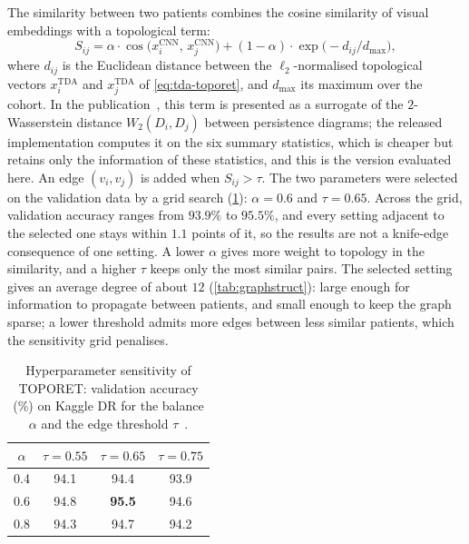 The similarity between two patients combines the cosine similarity of visual embeddings
with a topological term:
\begin{equation}
S_{ij} = \alpha\cdot\cos\bigl(x_i^{\mathrm{CNN}},\, x_j^{\mathrm{CNN}}\bigr)
       + (1-\alpha)\cdot\exp\bigl(-d_{ij}/d_{\max}\bigr),
\label{eq:dualsim}
\end{equation}
where $d_{ij}$ is the Euclidean distance between the $\ell_2$-normalised topological vectors
$x_i^{\mathrm{TDA}}$ and $x_j^{\mathrm{TDA}}$ of \cref{eq:tda-toporet}, and $d_{\max}$ its maximum over
the cohort. In the publication~\cite{belhadj2025plos}, this term is presented as a
surrogate of the $2$-Wasserstein distance $W_2(D_i,D_j)$ between persistence diagrams; the
released implementation computes it on the six summary statistics, which is cheaper but
retains only the information of these statistics, and this is the version evaluated here.
An edge
$(v_i,v_j)$ is added when $S_{ij}>\tau$. The two parameters were selected on the validation
data by a grid search (\cref{tab:hparam}): $\alpha=0.6$ and $\tau=0.65$. Across the grid,
validation accuracy ranges from $93.9\%$ to $95.5\%$, and every setting adjacent to the
selected one stays within $1.1$ points of it, so the results are not a knife-edge
consequence of one setting. A lower $\alpha$ gives more weight to topology in the
similarity, and a higher $\tau$ keeps only the most similar pairs. The selected setting
gives an average degree of about $12$ (\cref{tab:graphstruct}): large enough for information
to propagate between patients, and small enough to keep the graph sparse; a lower
threshold admits more edges between less similar patients, which the sensitivity grid
penalises.

\begin{table}[H]
\centering
\caption[Hyperparameter sensitivity of TOPORET]{Hyperparameter sensitivity of TOPORET: validation accuracy (\%) on Kaggle DR
for the balance $\alpha$ and the edge threshold $\tau$~\cite{belhadj2025plos}.}
\label{tab:hparam}
\small
\begin{tabular}{@{}cccc@{}}
\toprule
$\alpha$ & $\tau=0.55$ & $\tau=0.65$ & $\tau=0.75$ \\
\midrule
0.4 & 94.1 & 94.4 & 93.9 \\
0.6 & 94.8 & \textbf{95.5} & 94.6 \\
0.8 & 94.3 & 94.7 & 94.2 \\
\bottomrule
\end{tabular}
\end{table}

